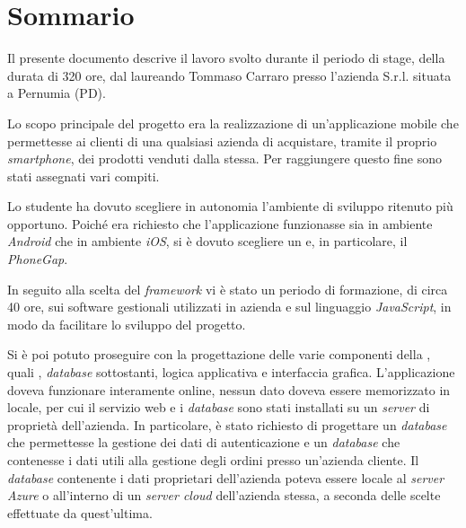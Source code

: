 
\cleardoublepage
{}
{}
\begingroup
\let\clearpage\relax
\let\cleardoublepage\relax
\let\cleardoublepage\relax

\chapter*{Sommario}

Il presente documento descrive il lavoro svolto durante il periodo di stage, della durata di 320 ore, dal laureando Tommaso Carraro presso l'azienda \visione{} S.r.l. situata a Pernumia (PD).

Lo scopo principale del progetto era la realizzazione di un'applicazione mobile che permettesse ai clienti di una qualsiasi azienda di acquistare, tramite il proprio \textit{smartphone}, dei prodotti venduti dalla stessa. Per raggiungere questo fine sono stati assegnati vari compiti.

Lo studente ha dovuto scegliere in autonomia l'ambiente di sviluppo ritenuto più opportuno. Poiché era richiesto che l'applicazione funzionasse sia in ambiente \textit{Android} che in ambiente \textit{iOS}, si è dovuto scegliere un  e, in particolare, il  \textit{PhoneGap}.

In seguito alla scelta del \textit{framework} vi è stato un periodo di formazione, di circa 40 ore, sui software gestionali utilizzati in azienda e sul linguaggio \textit{JavaScript}, in modo da facilitare lo sviluppo del progetto.

Si è poi potuto proseguire con la progettazione delle varie componenti della , quali , \textit{database} sottostanti, logica applicativa e interfaccia grafica. 
L'applicazione doveva funzionare interamente online, nessun dato doveva essere memorizzato in locale, per cui il servizio web e i \textit{database} sono stati installati su un \textit{server}  di proprietà dell'azienda.
In particolare, è stato richiesto di progettare un \textit{database} che permettesse la gestione dei dati di autenticazione e un \textit{database} che contenesse i dati utili alla gestione degli ordini presso un'azienda cliente. Il \textit{database} contenente i dati proprietari dell'azienda poteva essere locale al \textit{server Azure} o all'interno di un \textit{server cloud} dell'azienda stessa, a seconda delle scelte effettuate da quest'ultima.

